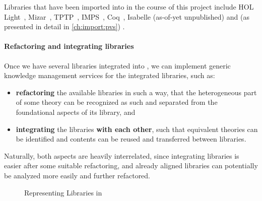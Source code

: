 Libraries that have been imported into \mmt in the course of this project include HOL Light~\cite{KR:hollight:14}, Mizar~\cite{IKRU:mizar:11}, TPTP~\cite{tptp}, IMPS~\cite{jbetzendahl:msc18}, Coq~\cite{coqmmt}, Isabelle (as-of-yet unpublished) and (as presented in detail in \autoref{ch:import:pvs}) \pvs.

\paragraph{Refactoring and integrating libraries} Once we have several libraries integrated into \mmt, we can implement generic knowledge management services for the integrated libraries, such as:
\begin{itemize}
	\item \textbf{refactoring} the available libraries in such a way, that the heterogeneous part of some theory can be recognized as such and separated from the foundational aspects of its library, and
	\item \textbf{integrating} the libraries \textbf{with each other}, such that equivalent theories can be identified and contents can be reused and transferred between libraries.
\end{itemize}
Naturally, both aspects are heavily interrelated, since integrating libraries is easier after some suitable refactoring, and already aligned libraries can potentially be analyzed more easily and further refactored.

\begin{figure}
\begin{center}
 \end{center}
\caption{Representing Libraries in \mmt}\label{fig:intro:oaf}
\end{figure}
